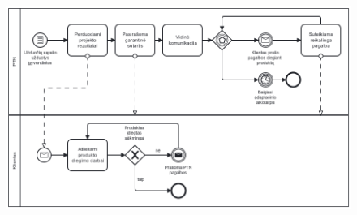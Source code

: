 \begin{figure}[!h]
    \centering
    \includegraphics[width=0.8\linewidth]{task-1/etc/diagrams/projectClosure.png}
\end{figure}
\newpage



